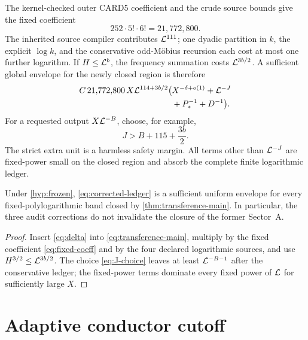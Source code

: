 The kernel-checked outer CARD5 coefficient and the crude source bounds give the
fixed coefficient
\begin{equation}\label{eq:fixed-coeff}
                  252\cdot5!\cdot6!=21{,}772{,}800.
\end{equation}
The inherited source compiler contributes $\mathcal L^{111}$; one dyadic partition in
$k$, the explicit $\log k$, and the conservative odd-M\"obius recursion each
cost at most one further logarithm.  If $H\le\mathcal L^b$, the frequency summation
costs $\mathcal L^{3b/2}$.  A sufficient global envelope for the newly closed region
is therefore
\begin{equation}\label{eq:corrected-ledger}
 \begin{split}
 C\,21{,}772{,}800\,X\mathcal L^{114+3b/2}
 \bigl(&X^{-\delta+o(1)}+\mathcal L^{-J}\\
       &+P_*^{-1}+D^{-1}\bigr).
 \end{split}
\end{equation}
For a requested output $X\mathcal L^{-B}$, choose, for example,
\begin{equation}\label{eq:J-choice}
                    J>B+115+\frac{3b}{2}.
\end{equation}
The strict extra unit is a harmless safety margin.  All terms other than
$\mathcal L^{-J}$ are fixed-power small on the closed region and absorb the complete
finite logarithmic ledger.

\begin{proposition}\label{prop:corrected-ledger}
Under \cref{hyp:frozen}, \cref{eq:corrected-ledger} is a sufficient uniform
envelope for every fixed-polylogarithmic band closed by
\cref{thm:transference-main}.  In particular, the three audit corrections do
not invalidate the closure of the former Sector~A.
\end{proposition}

\begin{proof}
Insert \cref{eq:delta} into \cref{eq:transference-main}, multiply by the
fixed coefficient \cref{eq:fixed-coeff} and by the four declared logarithmic
sources, and use $H^{3/2}\le\mathcal L^{3b/2}$.  The choice
\cref{eq:J-choice} leaves at least $\mathcal L^{-B-1}$ after the conservative ledger;
the fixed-power terms dominate every fixed power of $\mathcal L$ for sufficiently
large $X$.
\end{proof}

\section{Adaptive conductor cutoff}\label{sec:adaptive}

